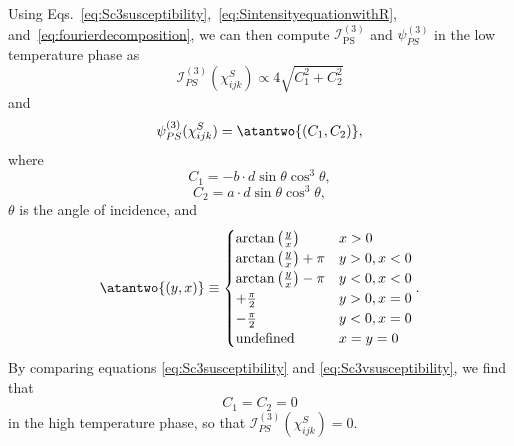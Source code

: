 Using Eqs.~\ref{eq:Sc3susceptibility},~\ref{eq:SintensityequationwithR}, and~\ref{eq:fourierdecomposition}, we can then compute $\mathscr{I}^{(3)}_\mathrm{PS}$ and $\psi_{PS}^{(3)}$ in the low temperature phase as 
\begin{equation}
\label{eq:i3PS}
\mathscr{I}_{PS}^{(3)}(\chi^S_{ijk}) \propto 4\sqrt{C_1^2+C_2^2}
\end{equation}
and
\begin{equation}
\psi_{PS}^{(3)}(\chi^S_{ijk}) = \atantwo{\left(C_1,C_2\right)},
\end{equation}
where
\begin{equation}
C_1 = -b\cdot d\sin{\theta}\cos^3{\theta},
\end{equation}
\begin{equation}
C_2 = a\cdot d\sin{\theta}\cos^3{\theta},
\end{equation}
$\theta$ is the angle of incidence, and
\begin{equation}
\atantwo{(y, x)} \equiv \begin{cases}
\arctan{\left(\frac{y}{x}\right)} & x >  0 \\
\arctan{\left(\frac{y}{x}\right)}+\pi & y>0,x <  0\\ 
\arctan{\left(\frac{y}{x}\right)}-\pi & y<0,x <  0\\ 
+\frac{\pi}{2} & y>0, x=0\\
-\frac{\pi}{2} & y<0, x=0\\
\mathrm{undefined}& x = y = 0 \end{cases}.
\end{equation}
By comparing equations \ref{eq:Sc3susceptibility} and \ref{eq:Sc3vsusceptibility}, we find that
\begin{equation}
C_1 = C_2 = 0
\end{equation}
in the high temperature phase, so that $\mathscr{I}_{PS}^{(3)}(\chi^S_{ijk}) = 0$. 
